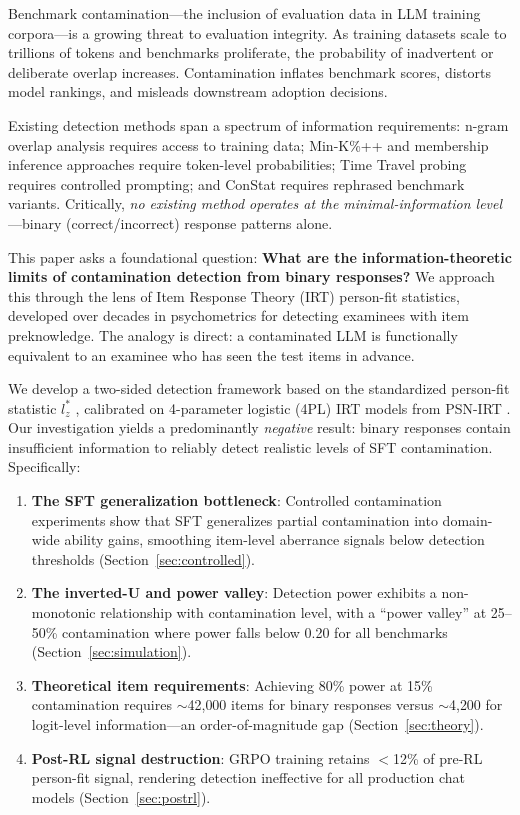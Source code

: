 \documentclass[11pt,a4paper]{article}
\newcommand{\lzstar}{$l_{z}^{*}$}
\begin{document}
Benchmark contamination---the inclusion of evaluation data in LLM training corpora---is a growing threat to evaluation integrity. As training datasets scale to trillions of tokens and benchmarks proliferate, the probability of inadvertent or deliberate overlap increases. Contamination inflates benchmark scores, distorts model rankings, and misleads downstream adoption decisions.

Existing detection methods span a spectrum of information requirements: n-gram overlap analysis requires access to training data; Min-K\%++ \citep{zhang2024minkpp} and membership inference approaches \citep{shi2024mia} require token-level probabilities; Time Travel probing \citep{oren2024timetravelprobe} requires controlled prompting; and ConStat \citep{dekoninck2024constat} requires rephrased benchmark variants. Critically, \emph{no existing method operates at the minimal-information level}---binary (correct/incorrect) response patterns alone.

This paper asks a foundational question: \textbf{What are the information-theoretic limits of contamination detection from binary responses?} We approach this through the lens of Item Response Theory (IRT) person-fit statistics, developed over decades in psychometrics for detecting examinees with item preknowledge. The analogy is direct: a contaminated LLM is functionally equivalent to an examinee who has seen the test items in advance.

We develop a two-sided detection framework based on the standardized person-fit statistic \lzstar{} \citep{snijders2001}, calibrated on 4-parameter logistic (4PL) IRT models from PSN-IRT \citep{psnirt2026}. Our investigation yields a predominantly \emph{negative} result: binary responses contain insufficient information to reliably detect realistic levels of SFT contamination. Specifically:

\begin{enumerate}
    \item \textbf{The SFT generalization bottleneck}: Controlled contamination experiments show that SFT generalizes partial contamination into domain-wide ability gains, smoothing item-level aberrance signals below detection thresholds (Section~\ref{sec:controlled}).
    \item \textbf{The inverted-U and power valley}: Detection power exhibits a non-monotonic relationship with contamination level, with a ``power valley'' at 25--50\% contamination where power falls below 0.20 for all benchmarks (Section~\ref{sec:simulation}).
    \item \textbf{Theoretical item requirements}: Achieving 80\% power at 15\% contamination requires $\sim$42{,}000 items for binary responses versus $\sim$4{,}200 for logit-level information---an order-of-magnitude gap (Section~\ref{sec:theory}).
    \item \textbf{Post-RL signal destruction}: GRPO training retains $<$12\% of pre-RL person-fit signal, rendering detection ineffective for all production chat models (Section~\ref{sec:postrl}).
\end{enumerate}
\end{document}
